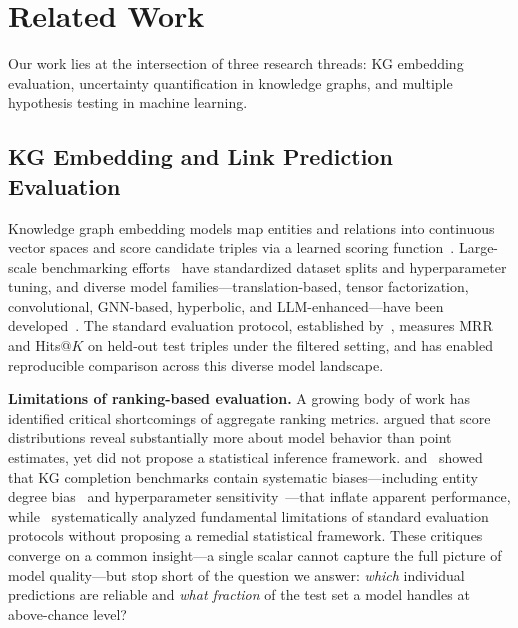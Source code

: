 \section{Related Work}
\label{sec:related}

Our work lies at the intersection of three research threads: KG embedding evaluation, uncertainty quantification in knowledge graphs, and multiple hypothesis testing in machine learning.

\subsection{KG Embedding and Link Prediction Evaluation}

Knowledge graph embedding models map entities and relations into continuous vector spaces and score candidate triples via a learned scoring function~\cite{wang2017knowledge}. Large-scale benchmarking efforts~\cite{ali2021pykeen,rossi2021knowledge} have standardized dataset splits and hyperparameter tuning, and diverse model families---translation-based, tensor factorization, convolutional, GNN-based, hyperbolic, and LLM-enhanced---have been developed~\cite{bordes2013translating,sun2019rotate,trouillon2016complex,dettmers2018convolutional,balazevic2019tucker,vashishth2020composition,zhu2021neural,le2023knowledge,lu2024deep,fang2025knowledge,gao2025unifying}. The standard evaluation protocol, established by~\cite{bordes2013translating}, measures MRR and Hits@$K$ on held-out test triples under the filtered setting, and has enabled reproducible comparison across this diverse model landscape.

\textbf{Limitations of ranking-based evaluation.}
A growing body of work has identified critical shortcomings of aggregate ranking metrics.
\cite{reimers2017reporting} argued that score distributions reveal substantially more about model behavior than point estimates, yet did not propose a statistical inference framework.
\cite{safavi2020evaluating} and~\cite{wang2023evaluation} showed that KG completion benchmarks contain systematic biases---including entity degree bias~\cite{shomer2023toward} and hyperparameter sensitivity~\cite{lloyd2023assessing}---that inflate apparent performance, while~\cite{liu2022understanding} systematically analyzed fundamental limitations of standard evaluation protocols without proposing a remedial statistical framework.
These critiques converge on a common insight---a single scalar cannot capture the full picture of model quality---but stop short of the question we answer: \emph{which} individual predictions are reliable and \emph{what fraction} of the test set a model handles at above-chance level?

